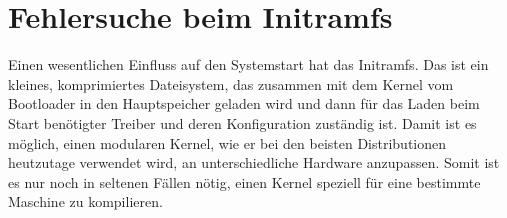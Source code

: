 









\section{Fehlersuche beim Initramfs}
\label{sec:lokal-initramfs}

Einen wesentlichen Einfluss auf den Systemstart hat das Initramfs.
Das ist ein kleines, komprimiertes Dateisystem, das zusammen mit dem Kernel
vom Bootloader in den Hauptspeicher geladen wird und dann für das Laden beim
Start benötigter Treiber und deren Konfiguration zuständig ist.
Damit ist es möglich, einen modularen Kernel, wie er bei den beisten
Distributionen heutzutage verwendet wird, an unterschiedliche Hardware
anzupassen.
Somit ist es nur noch in seltenen Fällen nötig, einen Kernel speziell für
eine bestimmte Maschine zu kompilieren.

